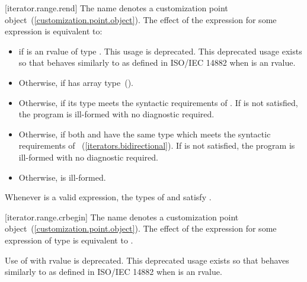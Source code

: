 \begin{addedblock}
[iterator.range.rend]{}
\pnum
The name  denotes a customization point
object~(\ref{customization.point.object}). The effect of the expression
 for some expression  is equivalent to:

\begin{itemize}
\item
   if  is an rvalue of
  type . This usage is deprecated.
  \enternote This deprecated usage exists so that
   behaves similarly to 
  as defined in ISO/IEC 14882 when  is an rvalue. \exitnote

\item
  Otherwise,  if  has
  array type~().

\item
  Otherwise,  if its type  meets the
  syntactic requirements of
  . If
   is not satisfied, the program is ill-formed with
  no diagnostic required.

\item
  Otherwise,  if both
   and  have the same
  type  which meets the syntactic requirements of
  ~(\ref{iterators.bidirectional}).
  If  is not satisfied, the program is
  ill-formed with no diagnostic required.

\item
  Otherwise,  is ill-formed.
\end{itemize}

\pnum
\remark Whenever  is a valid expression, the
types of  and  satisfy
.

[iterator.range.crbegin]{}
\pnum
The name  denotes a customization point
object~(\ref{customization.point.object}). The effect of the expression
 for some expression  of type 
is equivalent to .

\pnum
Use of  with rvalue  is deprecated.
\enternote This deprecated usage exists so that 
behaves similarly to  as defined in ISO/IEC 14882 when
 is an rvalue. \exitnote


\end{addedblock}
